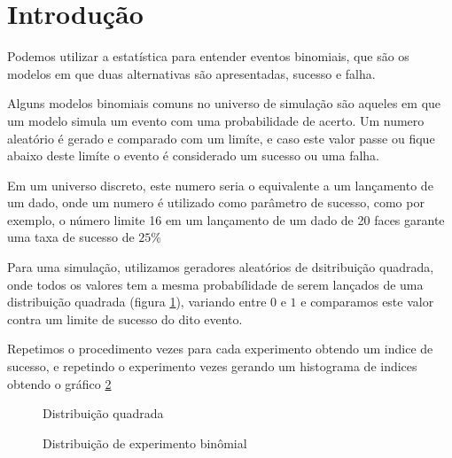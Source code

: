 \section{Introdu\c{c}\~{a}o}

Podemos utilizar a estat\'{i}stica para entender eventos binomiais, que s\~{a}o os modelos
em que duas alternativas s\~{a}o apresentadas, sucesso e falha.

Alguns modelos binomiais comuns no universo de simula\c{c}\~{a}o
s\~{a}o aqueles em que um modelo simula um evento com uma probabilidade de acerto.
Um numero aleat\'{o}rio \'{e} gerado
e comparado com um lim\'{i}te, e caso este valor passe ou
fique abaixo deste lim\'{i}te o evento \'{e} considerado um sucesso ou uma falha.

Em um universo discreto, este numero seria o equivalente a um lan\c{c}amento de um dado,
onde um numero \'{e} utilizado como par\^{a}metro de sucesso, como por exemplo, o número limite 16
em um lan\c{c}amento de um dado de 20 faces garante uma taxa de sucesso de $25\%$

Para uma simula\c{c}\~{a}o, utilizamos geradores aleat\'{o}rios de dsitribui\c{c}\~{a}o quadrada, onde
todos os valores tem a mesma probabílidade de serem lan\c{c}ados
de uma distribui\c{c}\~{a}o quadrada (figura \ref{intro:squared}), variando entre $0$ e $1$
e comparamos este valor contra um limite de sucesso do dito evento.

Repetimos o procedimento \introexperimentsize{} vezes para cada experimento obtendo um indice de sucesso,
e repetindo o experimento \introexperimentrepeats{} vezes gerando um histograma de indices obtendo o gr\'{a}fico
\ref{intro:binomial}

\begin{center}
\begin{figure}[H]
\begin{center}
\caption{Distribui\c{c}\~ao quadrada}
\label{intro:squared}
\end{center}
\end{figure}
\end{center}

\begin{center}
\begin{figure}[H]
\begin{center}
\caption{Distribui\c{c}\~ao de experimento bin\^omial}
\label{intro:binomial}
\end{center}
\end{figure}
\end{center}
